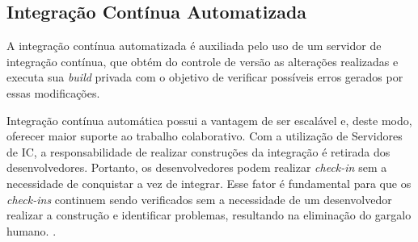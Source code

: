 \subsection{Integração Contínua Automatizada}
A integração contínua automatizada é auxiliada pelo uso de um servidor de integração contínua, que obtém do controle de versão as alterações realizadas e executa sua \textit{build} privada com o objetivo de verificar possíveis erros gerados por essas modificações.
\begin{citacao}
Integração contínua automática possui a vantagem de ser escalável e, deste  modo, oferecer  maior  suporte  ao  trabalho  colaborativo.  Com  a utilização de Servidores de IC, a responsabilidade  de realizar construções da integração é retirada  dos desenvolvedores. Portanto, os desenvolvedores podem realizar \textit{check-in} sem a necessidade de conquistar a vez de integrar. Esse fator é fundamental para que os  \textit{check-ins}  continuem sendo verificados sem a necessidade de um desenvolvedor realizar a construção e identificar problemas, resultando na eliminação do gargalo humano. . 
\end{citacao}

